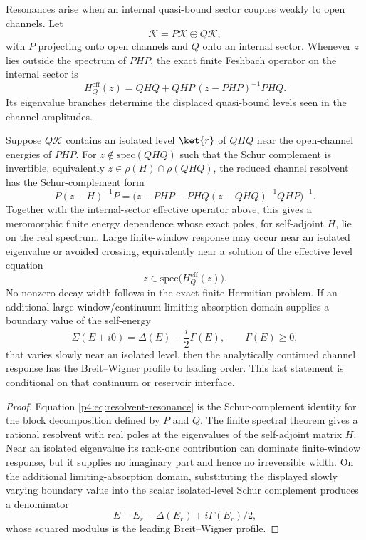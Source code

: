 \documentclass[12pt,a4paper]{article}
\begin{document}
Resonances arise when an internal quasi-bound sector couples weakly to open channels.
Let
\[
\mathcal K = P\mathcal K \oplus Q\mathcal K,
\]
with $P$ projecting onto open channels and $Q$ onto an internal sector.
Whenever $z$ lies outside the spectrum of $PHP$, the exact finite Feshbach operator on the internal sector is
\begin{equation}
\label{p4:eq:feshbach-effective}
H^{\mathrm{eff}}_Q(z)
=
QHQ + QHP\,(z-PHP)^{-1}PHQ.
\end{equation}
Its eigenvalue branches determine the displaced quasi-bound levels seen in the channel amplitudes.

\begin{theorem}
\label{p4:thm:finite-resonance-reduction}
Suppose $Q\mathcal K$ contains an isolated level $\ket{r}$ of $QHQ$ near the open-channel energies of $PHP$.
For $z\notin\mathrm{spec}(QHQ)$ such that the Schur complement is invertible, equivalently $z\in\rho(H)\cap\rho(QHQ)$, the reduced channel resolvent has the Schur-complement form
\begin{equation}
\label{p4:eq:resolvent-resonance}
P(z-H)^{-1}P
=
\bigl(z-PHP-PHQ(z-QHQ)^{-1}QHP\bigr)^{-1}.
\end{equation}
Together with the internal-sector effective operator above, this gives a
meromorphic finite energy dependence whose exact poles, for self-adjoint
\(H\), lie on the real spectrum.  Large finite-window response may occur
near an isolated eigenvalue or avoided crossing, equivalently near a
solution of the effective level equation
\begin{equation}
\label{p4:eq:effective-level-equation}
z\in\mathrm{spec}\bigl(H_Q^{\mathrm{eff}}(z)\bigr).
\end{equation}
No nonzero decay width follows in the exact finite Hermitian problem.  If an
additional large-window/continuum limiting-absorption domain supplies a
boundary value of the self-energy
\[
\Sigma(E+i0)=\Delta(E)-\frac{i}{2}\Gamma(E),
\qquad \Gamma(E)\ge0,
\]
that varies slowly near an isolated level, then the analytically continued
channel response has the Breit--Wigner profile to leading order.  This last
statement is conditional on that continuum or reservoir interface.
\end{theorem}

\begin{proof}
Equation \eqref{p4:eq:resolvent-resonance} is the Schur-complement identity
for the block decomposition defined by \(P\) and \(Q\).  The finite spectral
theorem gives a rational resolvent with real poles at the eigenvalues of the
self-adjoint matrix \(H\).  Near an isolated eigenvalue its rank-one
contribution can dominate finite-window response, but it supplies no
imaginary part and hence no irreversible width.  On the additional
limiting-absorption domain, substituting the displayed slowly varying
boundary value into the scalar isolated-level Schur complement produces a
denominator
\[
E-E_r-\Delta(E_r)+i\Gamma(E_r)/2,
\]
whose squared modulus is the leading Breit--Wigner profile.
\end{proof}
\end{document}
